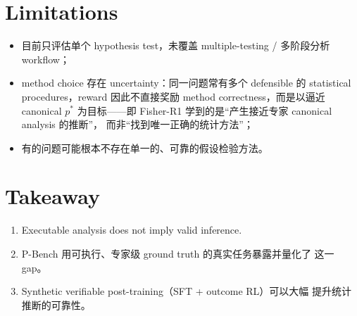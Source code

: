 \documentclass[12pt]{ctexart}
\begin{document}
\section{Limitations}

\begin{itemize}
  \item 目前只评估单个 hypothesis test，未覆盖 multiple-testing /
        多阶段分析 workflow；
  \item method choice 存在 uncertainty：同一问题常有多个 defensible 的
        statistical procedures，reward 因此不直接奖励 method
        correctness，而是以逼近 canonical $p^{*}$ 为目标——即
        Fisher-R1 学到的是``产生接近专家 canonical analysis 的推断''，
        而非``找到唯一正确的统计方法''；
  \item 有的问题可能根本不存在单一的、可靠的假设检验方法。
\end{itemize}

\section{Takeaway}

\begin{enumerate}
  \item Executable analysis does not imply valid inference.
  \item P-Bench 用可执行、专家级 ground truth 的真实任务暴露并量化了
        这一 gap。
  \item Synthetic verifiable post-training（SFT + outcome RL）可以大幅
        提升统计推断的可靠性。
\end{enumerate}
\end{document}
